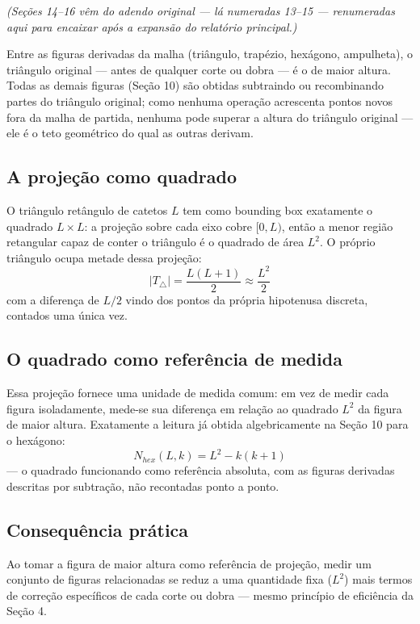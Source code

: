 \documentclass[11pt,a4paper]{article}
\begin{document}
\textit{(Seções 14--16 vêm do adendo original --- lá numeradas 13--15 --- renumeradas aqui para encaixar após a expansão do relatório principal.)}

Entre as figuras derivadas da malha (triângulo, trapézio, hexágono, ampulheta), o triângulo original --- antes de qualquer corte ou dobra --- é o de maior altura. Todas as demais figuras (Seção 10) são obtidas subtraindo ou recombinando partes do triângulo original; como nenhuma operação acrescenta pontos novos fora da malha de partida, nenhuma pode superar a altura do triângulo original --- ele é o teto geométrico do qual as outras derivam.

\subsection{A projeção como quadrado}

O triângulo retângulo de catetos $L$ tem como bounding box exatamente o quadrado $L \times L$: a projeção sobre cada eixo cobre $[0, L)$, então a menor região retangular capaz de conter o triângulo é o quadrado de área $L^2$. O próprio triângulo ocupa metade dessa projeção:
\[
|T_\triangle| = \frac{L(L+1)}{2} \approx \frac{L^2}{2}
\]
com a diferença de $L/2$ vindo dos pontos da própria hipotenusa discreta, contados uma única vez.

\subsection{O quadrado como referência de medida}

Essa projeção fornece uma unidade de medida comum: em vez de medir cada figura isoladamente, mede-se sua diferença em relação ao quadrado $L^2$ da figura de maior altura. Exatamente a leitura já obtida algebricamente na Seção 10 para o hexágono:
\[
N_{hex}(L,k) = L^2 - k(k+1)
\]
--- o quadrado funcionando como referência absoluta, com as figuras derivadas descritas por subtração, não recontadas ponto a ponto.

\subsection{Consequência prática}

Ao tomar a figura de maior altura como referência de projeção, medir um conjunto de figuras relacionadas se reduz a uma quantidade fixa ($L^2$) mais termos de correção específicos de cada corte ou dobra --- mesmo princípio de eficiência da Seção 4.
\end{document}
